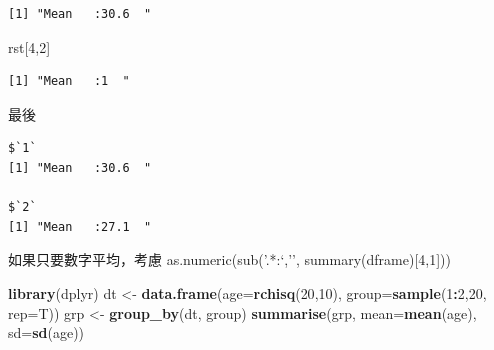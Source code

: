 \documentclass[]{book}
\newenvironment{Shaded}{\begin{snugshade}}{\end{snugshade}}
\newcommand{\ControlFlowTok}[1]{\textcolor[rgb]{0.13,0.29,0.53}{\textbf{#1}}}
\newcommand{\DataTypeTok}[1]{\textcolor[rgb]{0.13,0.29,0.53}{#1}}
\newcommand{\DecValTok}[1]{\textcolor[rgb]{0.00,0.00,0.81}{#1}}
\newcommand{\KeywordTok}[1]{\textcolor[rgb]{0.13,0.29,0.53}{\textbf{#1}}}
\newcommand{\NormalTok}[1]{#1}
\newcommand{\OperatorTok}[1]{\textcolor[rgb]{0.81,0.36,0.00}{\textbf{#1}}}
\newcommand{\StringTok}[1]{\textcolor[rgb]{0.31,0.60,0.02}{#1}}
\theoremstyle{definition}
\theoremstyle{definition}
\theoremstyle{definition}
\theoremstyle{remark}
\begin{document}
\begin{verbatim}
[1] "Mean   :30.6  "
\end{verbatim}

\begin{Shaded}
\begin{Highlighting}[]
\NormalTok{rst[}\DecValTok{4}\NormalTok{,}\DecValTok{2}\NormalTok{]}
\end{Highlighting}
\end{Shaded}

\begin{verbatim}
[1] "Mean   :1  "
\end{verbatim}

最後

\begin{Shaded}
\end{Shaded}

\begin{verbatim}
$`1`
[1] "Mean   :30.6  "

$`2`
[1] "Mean   :27.1  "
\end{verbatim}

如果只要數字平均，考慮 as.numeric(sub('.*:`,'',
summary(dframe){[}4,1{]}))

\begin{Shaded}
\begin{Highlighting}[]
\KeywordTok{library}\NormalTok{(dplyr)}
\NormalTok{dt <-}\StringTok{ }\KeywordTok{data.frame}\NormalTok{(}\DataTypeTok{age=}\KeywordTok{rchisq}\NormalTok{(}\DecValTok{20}\NormalTok{,}\DecValTok{10}\NormalTok{), }\DataTypeTok{group=}\KeywordTok{sample}\NormalTok{(}\DecValTok{1}\OperatorTok{:}\DecValTok{2}\NormalTok{,}\DecValTok{20}\NormalTok{, }\DataTypeTok{rep=}\NormalTok{T))}
\NormalTok{grp <-}\StringTok{ }\KeywordTok{group_by}\NormalTok{(dt, group)}
\KeywordTok{summarise}\NormalTok{(grp, }\DataTypeTok{mean=}\KeywordTok{mean}\NormalTok{(age), }\DataTypeTok{sd=}\KeywordTok{sd}\NormalTok{(age))}
\end{Highlighting}
\end{Shaded}
\end{document}
